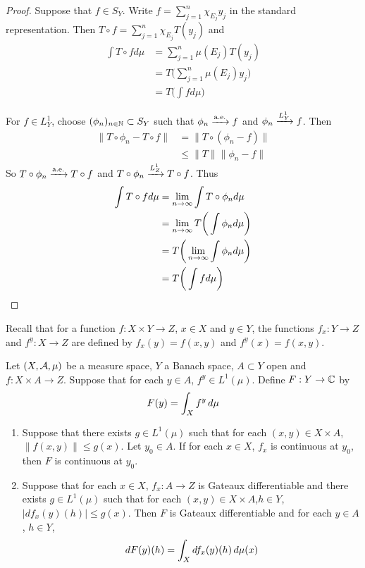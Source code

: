 \documentclass{book}
\begin{document}
	\begin{proof}
	Suppose that $f \in S_Y$. Write $f = \sum\limits_{j=1}^n \chi_{E_j}y_j $ in the standard representation. Then $T \circ f = \sum\limits_{j=1}^n \chi_{E_j}T(y_j)$  and 
	\begin{align*}
	\int T \circ f d \mu 
	&= \sum\limits_{j=1}^n \mu(E_j)T(y_j) \\
	&= T \bigg(\sum\limits_{j=1}^n \mu(E_j)y_j \bigg) \\
	&= T \bigg( \int f d\mu \bigg)
	\end{align*}
	
	For $f \in L^1_Y$, choose $(\phi_n)_{n \in \mathbb{N}} \subset S_Y$ such that $\phi_n \xrightarrow{\text{a.e.}} f$ and $\phi_n \xrightarrow{L^1_Y} f$. Then 
	\begin{align*}
	\|T \circ \phi_n - T \circ f\| 
	&= \|T \circ (\phi_n - f)\| \\
	& \leq \|T\| \|\phi_n - f\|
	\end{align*}
	So $T \circ \phi_n \xrightarrow{\text{a.e.}} T \circ f$ and $T \circ \phi_n \xrightarrow{L^1_Z} T \circ f $. Thus 
	\begin{align*}
	\int T \circ f d\mu 
	&= \lim \limits_{n \rightarrow \infty} \int T \circ \phi_n d\mu \\
	&= \lim \limits_{n \rightarrow \infty} T \bigg( \int \phi_n d\mu \bigg) \\
	&= T \bigg( \lim \limits_{n \rightarrow \infty} \int \phi_n d\mu \bigg) \\
	&= T \bigg( \int f d\mu  \bigg)
	\end{align*}
	\end{proof}
	
	\begin{note}
	Recall that for a function $f:X \times Y \rightarrow Z$, $x \in X$ and $y \in Y$, the functions $f_x:Y \rightarrow Z$ and $f^y:X \rightarrow Z$ are defined by $f_x(y) = f(x,y)$ and $f^y(x) = f(x,y)$.
	\end{note}
	
	\begin{ex}  
	Let $(X, \mathcal{A}, \mu)$ be a measure space,  $Y$ a Banach space, $A \subset Y$ open and $f:X \times A \rightarrow Z$. Suppose that for each $y \in A$, $f^y \in L^1(\mu)$. Define $F: Y \rightarrow \mathbb{C}$ by 
	$$F(y) = \int_X f^y \, d \mu $$ 
	\begin{enumerate}
	\item Suppose that there exists $g \in L^1(\mu)$ such that for each $(x, y) \in X \times A$, $\|f(x,y)\| \leq g(x)$. Let $y_0 \in A$. If for each $x \in X$, $f_x$ is continuous at $y_0$, then $F$ is continuous at $y_0$. 
 	\item Suppose that for each $x \in X$, $f_x:A \rightarrow Z$ is Gateaux differentiable and there exists $g \in L^1(\mu)$ such that for each $(x, y) \in X \times A$,$h \in Y$,  $| df_x(y)(h) | \leq g(x)$. Then $F$ is Gateaux differentiable and for each $y \in A$, $h \in Y$, $$dF(y)(h) = \int_X df_x(y)(h) \, d \mu(x)$$
	\end{enumerate}
	\end{ex}
	
\end{document}
